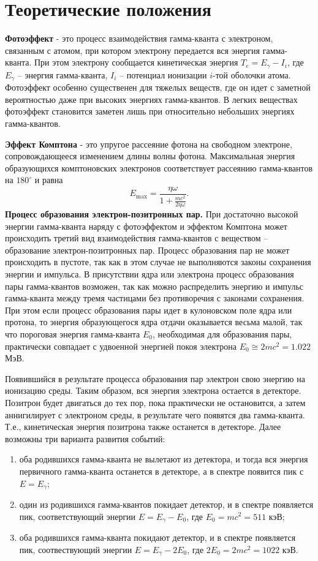 \documentclass[a4paper, 12pt]{article}
\begin{document}
\section*{Теоретические положения}
\textbf{Фотоэффект} - это процесс взаимодействия гамма-кванта с электроном, связанным с атомом, при котором электрону передается вся энергия гамма-кванта. При этом электрону сообщается кинетическая энергия $T_e=E_\gamma-I_i$, где $E_\gamma$ -- энергия гамма-кванта, $I_i$ -- потенциал ионизации $i$-той оболочки атома. Фотоэффект особенно существенен для тяжелых веществ, где он идет с заметной вероятностью даже при высоких энергиях гамма-квантов. В легких веществах фотоэффект становится заметен лишь при относительно небольших энергиях гамма-квантов.  \par
\textbf{Эффект Комптона} - это упругое рассеяние фотона на свободном электроне, сопровождающееся изменением длины волны фотона. Максимальная энергия образующихся комптоновских электронов соответствует рассеянию гамма-квантов на $180^\circ$ и равна
\begin{equation}
E_{\max}=\frac{\eta\omega}{1+\frac{mc^2}{2\eta\omega}}.
\end{equation}
\textbf{Процесс образования электрон-позитронных пар.}
При достаточно высокой энергии гамма-кванта наряду с фотоэффектом и эффектом Комптона может происходить третий вид взаимодействия гамма-квантов с веществом -- образование электрон-позитронных пар. Процесс образования пар не может происходить в пустоте, так как в этом случае не выполняются законы сохранения энергии и импульса. В присутствии ядра или электрона процесс образования пары гамма-квантов возможен, так как можно распределить энергию и импульс гамма-кванта между тремя частицами без противоречия с законами сохранения. При этом если процесс образования пары идет в кулоновском поле ядра или протона, то энергия образующегося ядра отдачи оказывается весьма малой, так что пороговая энергия гамма-кванта $E_0$, необходимая для образования пары, практически совпадает с удвоенной энергией покоя электрона $E_0\cong 2mc^2=1.022$ МэВ.\par
Появившийся в результате процесса образования пар электрон свою энергию на ионизацию среды. Таким образом, вся энергия электрона остается в детекторе. Позитрон будет двигаться до тех пор, пока практически не остановится, а затем аннигилирует с электроном среды, в результате чего появятся два гамма-кванта. Т.е., кинетическая энергия позитрона также останется в детекторе. Далее возможны три варианта развития событий:
\begin{enumerate}
\item оба родившихся гамма-кванта не вылетают из детектора, и тогда вся энергия первичного гамма-кванта останется в детекторе, а в спектре появится пик с $E=E_{\gamma}$;
\item один из родившихся гамма-квантов покидает детектор, и в спектре появляется пик, соответствующий энергии $E=E_{\gamma}-E_0$, где $E_0=mc^2=511$ кэВ;
\item оба родившихся гамма-кванта покидают детектор, и в спектре появляется пик, соотвествующий энергии $E=E_{\gamma}-2E_0$, где $2E_0=2mc^2=1022$ кэВ.
\end{enumerate}
\end{document}
